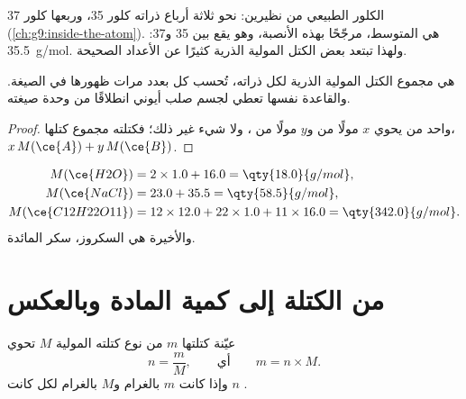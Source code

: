 \begin{remark}\label{rem:g10:the-mole:chlorine}
الكلور الطبيعي  من نظيرين: نحو ثلاثة أرباع ذراته كلور 35، وربعها كلور 37
(\cref{ch:g9:inside-the-atom}).  هي المتوسط، مرجّحًا بهذه
الأنصبة، وهو يقع بين 35 و37: \qty{35.5}{g/mol}.
ولهذا تبتعد بعض الكتل المولية الذرية كثيرًا عن الأعداد الصحيحة.
\end{remark}

\begin{proposition}\label{prop:g10:the-mole:sum}
  هي مجموع الكتل المولية الذرية لكل ذراته، تُحسب كل 
بعدد مرات ظهورها في الصيغة. والقاعدة نفسها تعطي  لجسم صلب
أيوني انطلاقًا من وحدة صيغته.
\end{proposition}

\begin{proof}
 واحد من   يحوي $x$ مولًا من  
و$y$ مولًا من  ، ولا شيء غير ذلك؛ فكتلته مجموع
كتلها، $x\,M(\ce{A}) + y\,M(\ce{B})$.
\end{proof}

\begin{example}\label{ex:g10:the-mole:three}
\begin{align*}
  M(\ce{H2O}) &= 2 \times 1.0 + 16.0 = \qty{18.0}{g/mol},\\
  M(\ce{NaCl}) &= 23.0 + 35.5 = \qty{58.5}{g/mol},\\
  M(\ce{C12H22O11}) &= 12 \times 12.0 + 22 \times 1.0 + 11 \times 16.0
     = \qty{342.0}{g/mol}.
\end{align*}
والأخيرة هي السكروز، سكر المائدة.
\end{example}

\section{من الكتلة إلى كمية المادة وبالعكس}

\begin{proposition}\label{prop:g10:the-mole:mass}
عيّنة كتلتها $m$ من نوع كتلته المولية $M$ تحوي 
\[
  n = \frac{m}{M}, \qquad\text{أي}\qquad m = n \times M .
\]
وإذا كانت $m$ بالغرام و$M$ بالغرام لكل  كانت $n$ .
\end{proposition}

